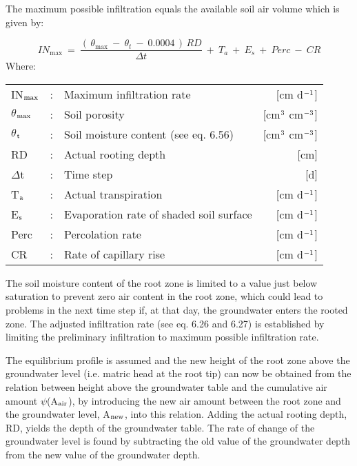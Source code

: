 The maximum possible infiltration equals the available soil air volume which is given by:

\begin{equation}
IN _{\max } ~=~{\frac{(\, \theta _{\max } ~-~ \theta _{t} ~-~ 0.0004\, )\, RD}{\Delta t}} ~+~ T _{a} ~+~ E _{s} ~+~ Perc ~-~ CR
\end{equation}
Where:\\[5pt]
\begin{tabularx}{\textwidth}{llXr}
IN$_{{\rm max}}$ &:& Maximum infiltration rate  & [cm d$^{{\rm -1}}$]\\
$\theta$$_{{\rm max}}$ &:& Soil porosity  & [cm$^{{\rm 3}}$ cm$^{{\rm -3}}$]\\
$\theta$$_{{\rm t}}$ &:& Soil moisture content (see eq. 6.56)  & [cm$^{{\rm 3}}$ cm$^{{\rm -3}}$]\\
RD &:& Actual rooting depth  & [cm]\\
$\Delta$t &:& Time step  & [d]\\
T$_{{\rm a}}$ &:& Actual transpiration  & [cm d$^{{\rm -1}}$]\\
E$_{{\rm s}}$ &:& Evaporation rate of shaded soil surface  & [cm d$^{{\rm -1}}$]\\
Perc &:& Percolation rate  & [cm d$^{{\rm -1}}$]\\
CR &:& Rate of capillary rise  & [cm d$^{{\rm -1}}$]\\
\end{tabularx}

The soil moisture content of the root zone is limited to a value just below saturation to
prevent zero air content in the root zone, which could lead to problems in the next time
step if, at that day, the groundwater enters the rooted zone. The adjusted infiltration rate
(see eq. 6.26 and 6.27) is established by limiting the preliminary infiltration to maximum
possible infiltration rate.

The equilibrium profile is assumed and the new height of the root zone above the
groundwater level (i.e. matric head at the root tip) can now be obtained from the relation
between height above the groundwater table and the cumulative air amount $\psi$(A$_{{\rm air}}$), by
introducing the new air amount between the root zone and the groundwater level, A$_{{\rm new}}$,
into this relation. Adding the actual rooting depth, RD, yields the depth of the groundwater 
table. The rate of change of the groundwater level is found by subtracting the old
value of the groundwater depth from the new value of the groundwater depth. 

